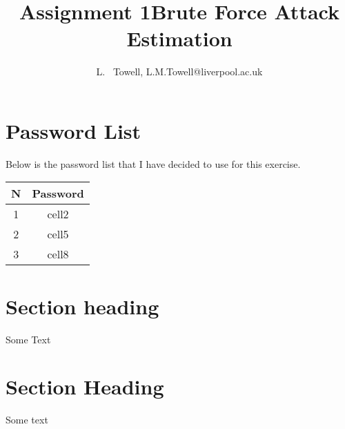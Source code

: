 \documentclass[a4paper, twoside, 11pt]{article}
\author{L. ~Towell, L.M.Towell@liverpool.ac.uk}
\title{Assignment 1\break Brute Force Attack Estimation}
\begin{document}
	\maketitle

\maketitle
\section{Password List}
Below is the password list that I have decided to use for this exercise.
\begin{center}
	\begin{tabular}{ |c|c| } 
	 \hline
	 N & Password \\
	 \hline
	 1 & cell2 \\ 
	 2 & cell5 \\ 
	 3 & cell8 \\ 
	 \hline
	\end{tabular}
\end{center}

\section{Section heading}
Some Text

\section{Section Heading}
Some text
\end{document}
